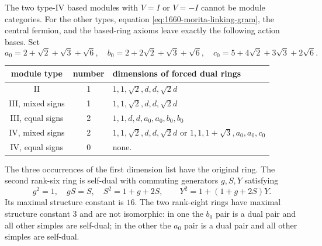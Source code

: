 \begin{theorem}
The two type-IV based modules with $V=I$ or $V=-I$ cannot be module
categories. For the other types, equation \eqref{eq:1660-morita-linking-gram}, the central fermion,
and the based-ring axioms leave exactly the following action bases.
Set
\[
a_0=2+\sqrt2+\sqrt3+\sqrt6,\quad
b_0=2+2\sqrt2+\sqrt3+\sqrt6,\quad
c_0=5+4\sqrt2+3\sqrt3+2\sqrt6.
\]
\begin{center}\begin{tabular}{c|c|l}
module type&number&dimensions of forced dual rings\\\hline
II&1&$1,1,\sqrt2,d,d,\sqrt2d$\\
III, mixed signs&1&$1,1,\sqrt2,d,d,\sqrt2d$\\
III, equal signs&2&$1,1,d,d,a_0,a_0,b_0,b_0$\\
IV, mixed signs&2&$1,1,\sqrt2,d,d,\sqrt2d$ or $1,1,1+\sqrt3,a_0,a_0,c_0$\\
IV, equal signs&0&none.
\end{tabular}\end{center}
The three occurrences of the first dimension list have the original
ring. The second rank-six ring is self-dual with commuting generators
$g,S,Y$ satisfying
\[
g^2=1,\quad gS=S,\quad S^2=1+g+2S,\qquad
Y^2=1+(1+g+2S)Y.
\]
Its maximal structure constant is $16$.
The two rank-eight rings have maximal structure constant $3$ and are
not isomorphic: in one the $b_0$ pair is a dual pair and all other simples
are self-dual; in the other the $a_0$ pair is a dual pair and all other
simples are self-dual.
\end{theorem}
